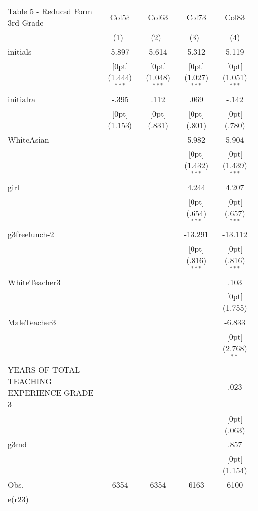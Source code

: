 \documentclass[a4paper,11pt]{article}
\begin{document}
	
\begin{table}
	\small
\begin{tabular*}{\textwidth}{@{\extracolsep{\fill}}lcccc}						Table 5 - Reduced Form 3rd Grade			& \multicolumn{1}{c}{Col53} &	\multicolumn{1}{c}{Col63} &	\multicolumn{1}{c}{Col73} &	\multicolumn{1}{c}{Col83} \\
		\cline{2-5}				
		& \multicolumn{1}{c}{(1)\mbox{\ }} &	\multicolumn{1}{c}{(2)\mbox{\ }} &	\multicolumn{1}{c}{(3)\mbox{\ }} &	\multicolumn{1}{c}{(4)} \\
		\hline				
		initials &	5.897 &	5.614 &	5.312 &	5.119 \\
		&	\raisebox{.7ex}[0pt]{\scriptsize (1.444)$^{***}$} &	\raisebox{.7ex}[0pt]{\scriptsize (1.048)$^{***}$} &	\raisebox{.7ex}[0pt]{\scriptsize (1.027)$^{***}$} &	\raisebox{.7ex}[0pt]{\scriptsize (1.051)$^{***}$} \\
		initialra &	-.395 &	.112 &	.069 &	-.142 \\
		&	\raisebox{.7ex}[0pt]{\scriptsize (1.153)} &	\raisebox{.7ex}[0pt]{\scriptsize (.831)} &	\raisebox{.7ex}[0pt]{\scriptsize (.801)} &	\raisebox{.7ex}[0pt]{\scriptsize (.780)} \\
		WhiteAsian &	&	&	5.982 &	5.904 \\
		&	&	&	\raisebox{.7ex}[0pt]{\scriptsize (1.432)$^{***}$} &	\raisebox{.7ex}[0pt]{\scriptsize (1.439)$^{***}$} \\
		girl &	&	&	4.244 &	4.207 \\
		&	&	&	\raisebox{.7ex}[0pt]{\scriptsize (.654)$^{***}$} &	\raisebox{.7ex}[0pt]{\scriptsize (.657)$^{***}$} \\
		g3freelunch-2 &	&	&	-13.291 &	-13.112 \\
		&	&	&	\raisebox{.7ex}[0pt]{\scriptsize (.816)$^{***}$} &	\raisebox{.7ex}[0pt]{\scriptsize (.816)$^{***}$} \\
		WhiteTeacher3 &	&	&	&	.103 \\
		&	&	&	&	\raisebox{.7ex}[0pt]{\scriptsize (1.755)} \\
		MaleTeacher3 &	&	&	&	-6.833 \\
		&	&	&	&	\raisebox{.7ex}[0pt]{\scriptsize (2.768)$^{**}$} \\
		YEARS OF TOTAL TEACHING EXPERIENCE GRADE 3 &	&	&	&	.023 \\
		&	&	&	&	\raisebox{.7ex}[0pt]{\scriptsize (.063)} \\
		g3md &	&	&	&	.857 \\
		&	&	&	&	\raisebox{.7ex}[0pt]{\scriptsize (1.154)} \\
		Obs. &	6354 &	6354 &	6163 &	6100 \\
		e(r23) &	&	&	&	\\
		\hline\hline				
	\end{tabular*}%
\end{table}	
\end{document}
